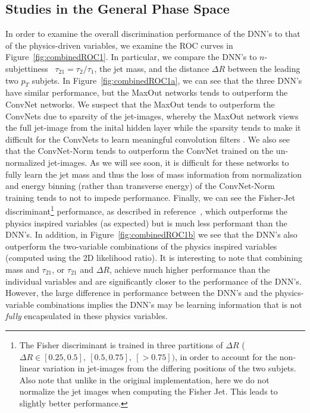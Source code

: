 
\subsection{Studies in the General Phase Space} %
\label{sub:coarse_studies}

In order to examine the overall discrimination performance of the DNN's to that of the physics-driven variables, we examine the ROC curves in Figure~\ref{fig:combinedROC1}. In particular, we compare the DNN's to $n$-subjettiness~\cite{nsub} $\tau_{21} = \tau_{2}/\tau_{1}$, the jet mass, and the distance $\Delta R$ between the leading two $p_{T}$ subjets.  In Figure~\ref{fig:combinedROC1a}, we can see that the three DNN's have similar performance, but the MaxOut networks tends to outperform the ConvNet networks.  We suspect that the MaxOut tends to outperform the ConvNets due to sparsity of the jet-images, whereby the MaxOut network views the full jet-image from the inital hidden layer while the sparsity tends to make it difficult for the ConvNets to learn meaningful convolution filters .  We also see that the ConvNet-Norm tends to outperform the ConvNet trained on the un-normalized jet-images.  As we will see soon,  it is difficult for these networks to fully learn the jet mass and thus the loss of mass information from normalization and energy  binning (rather than transverse energy) of the ConvNet-Norm training tends to not to impede performance.   Finally, we can see the Fisher-Jet discriminant\footnote{The Fisher discriminant is trained in three partitions of $\Delta  R$ ($\Delta R \in [0.25, 0.5],\ [0.5, 0.75],\ [>0.75])$, in order to account for the non-linear variation in jet-images from the differing positions of the two subjets.  Also note that unlike in the original implementation, here we do not normalize the jet images when computing the Fisher Jet.  This leads to slightly better performance.} performance, as described in reference~\cite{Cogan:2014oua}, which outperforms the physics inspired variables (as expected) but is much less performant than the DNN's. In addition, in Figure~\ref{fig:combinedROC1b} we see that the DNN's also outperform the two-variable combinations of the physics inspired variables (computed using the 2D likelihood ratio).   It is interesting to note that combining mass and $\tau_{21}$, or $\tau_{21}$ and $\Delta R$, achieve much higher performance than the individual variables and are significantly closer to the performance of the DNN's.  However, the large difference in performance between the DNN's and the physics-variable combinations implies the DNN's may be learning information that is not \emph{fully} encapsulated in these physics variables.
